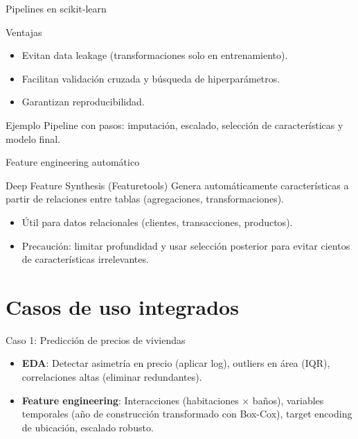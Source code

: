 \documentclass[aspectratio=169, 10pt, xcolor=table]{beamer}
\begin{document}
\begin{frame}{Pipelines en scikit-learn}
    \begin{block}{Ventajas}
        \begin{itemize}
            \item Evitan data leakage (transformaciones solo en entrenamiento).
            \item Facilitan validación cruzada y búsqueda de hiperparámetros.
            \item Garantizan reproducibilidad.
        \end{itemize}
    \end{block}
    \begin{exampleblock}{Ejemplo}
        Pipeline con pasos: imputación, escalado, selección de características y modelo final.
    \end{exampleblock}
\end{frame}

\begin{frame}{Feature engineering automático}
    \begin{block}{Deep Feature Synthesis (Featuretools)}
        Genera automáticamente características a partir de relaciones entre tablas (agregaciones, transformaciones).
    \end{block}
    \begin{itemize}
        \item Útil para datos relacionales (clientes, transacciones, productos).
        \item Precaución: limitar profundidad y usar selección posterior para evitar cientos de características irrelevantes.
    \end{itemize}
\end{frame}

\section{Casos de uso integrados}

\begin{frame}{Caso 1: Predicción de precios de viviendas}
    \begin{itemize}
        \item \textbf{EDA}: Detectar asimetría en precio (aplicar log), outliers en área (IQR), correlaciones altas (eliminar redundantes).
        \item \textbf{Feature engineering}: Interacciones (habitaciones × baños), variables temporales (año de construcción transformado con Box-Cox), target encoding de ubicación, escalado robusto.
    \end{itemize}
\end{frame}
\end{document}
